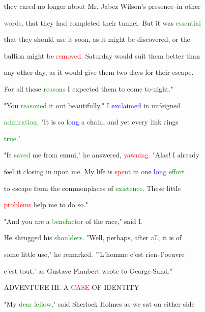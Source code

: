  they cared no longer about Mr. Jabez Wilson's presence--in other

 \textcolor{green}{words,} that they had completed their tunnel. But it was \textcolor{green}{essential}

 that they should use it soon, as it might be discovered, or the

 bullion might be \textcolor{red}{removed.} Saturday would suit them better than

 any other day, as it would give them two days for their \textcolor{BurntOrange}{escape.}

 For all these \textcolor{green}{reasons} I \textcolor{BurntOrange}{expected} them to come to-night."



 "You \textcolor{green}{reasoned} it out beautifully," I \textcolor{blue}{exclaimed} in unfeigned

 \textcolor{green}{admiration.} "It is so \textcolor{blue}{long} a chain, and yet every link rings

 \textcolor{green}{true."}



 "It \textcolor{green}{saved} me from ennui," he answered, \textcolor{red}{yawning.} "Alas! I already

 feel it closing in upon me. My life is \textcolor{red}{spent} in one \textcolor{blue}{long} \textcolor{green}{effort}

 to \textcolor{BurntOrange}{escape} from the \textcolor{BurntOrange}{commonplaces} of \textcolor{green}{existence.} These little

 \textcolor{red}{problems} help me to do so."



 "And you are a \textcolor{green}{benefactor} of the race," said I.



 He shrugged his \textcolor{green}{shoulders.} "Well, perhaps, after all, it is of

 some little use," he remarked. "'L'homme c'est rien--l'oeuvre

 c'est tout,' as Gustave Flaubert wrote to George Sand."







 \textcolor{BurntOrange}{ADVENTURE} III. A \textcolor{red}{CASE} OF IDENTITY



 "My \textcolor{green}{dear} \textcolor{green}{fellow,"} said Sherlock Holmes as we sat on either side


